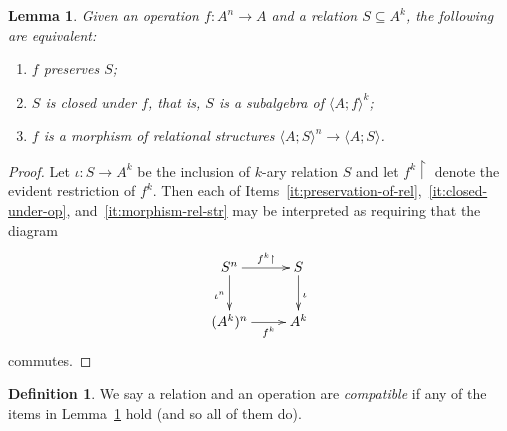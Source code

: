 \documentclass[11pt, a4paper, twoside,leqno]{amsart}
\newcommand{\cd}[2][]{\vcenter{\hbox{\xymatrix#1{#2}}}}
\numberwithin{equation}{section}
\theoremstyle{plain}
\newtheorem{Lemma}[Thm]{Lemma}
\theoremstyle{definition}
\newtheorem{Defn}[Thm]{Definition}
\begin{document}
\begin{Lemma}
  \label{lem:compatibility}
  Given an operation \(f \colon A^{n} \rightarrow A\) and a relation \(S
  \subseteq A^{k}\), the following are equivalent:
  \begin{enumerate}
    [label=(\alph*), ref=(\alph*)]
  \item
    \label{it:preservation-of-rel}
    \(f\) preserves \(S \);
  \item
    \label{it:closed-under-op}
    \(S \) is \emph{closed} under \(f\), that is, \(S\) is a subalgebra of
    \(\langle A; f \rangle^{k}\);
  \item
    \label{it:morphism-rel-str}
    \(f\) is a morphism of relational structures
    \(\langle A; S  \rangle^{n} \rightarrow \langle A; S \rangle\).
  \end{enumerate}
\end{Lemma}

\begin{proof}
  Let \(\iota \colon S \rightarrow
  A^{k}\) be the inclusion of \(k\)-ary
  relation \(S\) and let \(f^{k}\!\upharpoonright\) denote the evident
  restriction of \(f^{k}\). Then each of Items~\ref{it:preservation-of-rel},~\ref{it:closed-under-op},
  and~\ref{it:morphism-rel-str} may be interpreted as requiring that the diagram
  \begin{equation*}
    \cd{
      {S^{n}} \ar[r]^-{f^{k}\upharpoonright}
      \ar[d]_{\iota^{n}} &
      {S} \ar[d]^{\iota} \\
      {(A^{k})^{n}} \ar[r]_-{f^{k}} &
      {A^{k}}
    } 
  \end{equation*}
  commutes.
\end{proof}


\begin{Defn}
  \label{def:compatible-rel-op}
  We say a relation and an operation are \emph{compatible} if any of the
  items in Lemma~\ref{lem:compatibility} hold (and so all of them do).
\end{Defn}
\end{document}
